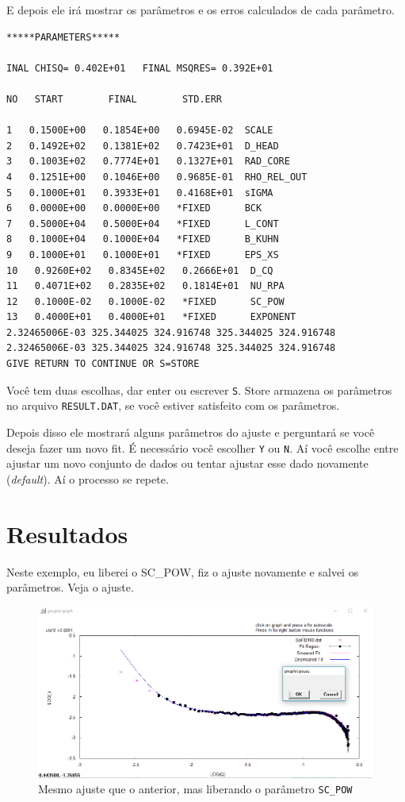 \begin{apendicesenv}
E depois ele irá mostrar os parâmetros e os erros calculados de cada parâmetro.

\begin{samepage}
\begin{verbatim}
*****PARAMETERS*****

INAL CHISQ= 0.402E+01   FINAL MSQRES= 0.392E+01

NO   START        FINAL        STD.ERR

1   0.1500E+00   0.1854E+00   0.6945E-02  SCALE
2   0.1492E+02   0.1381E+02   0.7423E+01  D_HEAD
3   0.1003E+02   0.7774E+01   0.1327E+01  RAD_CORE
4   0.1251E+00   0.1046E+00   0.9685E-01  RHO_REL_OUT
5   0.1000E+01   0.3933E+01   0.4168E+01  sIGMA
6   0.0000E+00   0.0000E+00   *FIXED      BCK
7   0.5000E+04   0.5000E+04   *FIXED      L_CONT
8   0.1000E+04   0.1000E+04   *FIXED      B_KUHN
9   0.1000E+01   0.1000E+01   *FIXED      EPS_XS
10   0.9260E+02   0.8345E+02   0.2666E+01  D_CQ
11   0.4071E+02   0.2835E+02   0.1814E+01  NU_RPA
12   0.1000E-02   0.1000E-02   *FIXED      SC_POW
13   0.4000E+01   0.4000E+01   *FIXED      EXPONENT
2.32465006E-03 325.344025 324.916748 325.344025 324.916748
2.32465006E-03 325.344025 324.916748 325.344025 324.916748
GIVE RETURN TO CONTINUE OR S=STORE
\end{verbatim}
\end{samepage}

Você tem duas escolhas, dar enter ou escrever \texttt{S}. Store armazena os parâmetros no arquivo \texttt{RESULT.DAT}, se você estiver satisfeito com os parâmetros.

Depois disso ele mostrará alguns parâmetros do ajuste e perguntará se você deseja fazer um novo fit. É necessário você escolher \texttt{Y} ou \texttt{N}. Aí você escolhe entre ajustar um novo conjunto de dados ou tentar ajustar esse dado novamente (\textit{default}). Aí o processo se repete.

\section{Resultados}

Neste exemplo, eu liberei o SC\_POW, fiz o ajuste novamente e salvei os parâmetros. Veja o ajuste.

\begin{figure}
	\centering
	\includegraphics[scale=0.5]{./imagens/saxs/supersaxs_gnuplot_fit2}
	\caption{Mesmo ajuste que o anterior, mas liberando o parâmetro \texttt{SC\_POW}}
\end{figure}


\end{apendicesenv}
